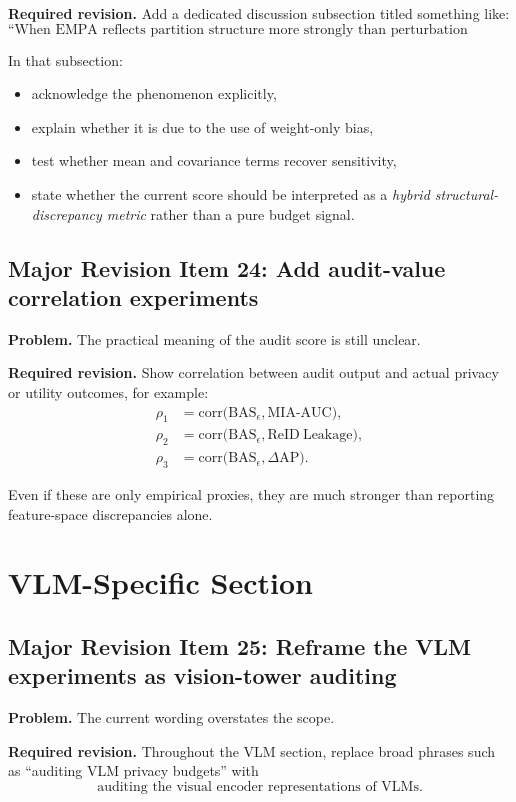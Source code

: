 \textbf{Required revision.}
Add a dedicated discussion subsection titled something like:
\[
\text{``When EMPA reflects partition structure more strongly than perturbation magnitude.''}
\]

In that subsection:
\begin{itemize}
    \item acknowledge the phenomenon explicitly,
    \item explain whether it is due to the use of weight-only bias,
    \item test whether mean and covariance terms recover sensitivity,
    \item state whether the current score should be interpreted as a \emph{hybrid structural-discrepancy metric} rather than a pure budget signal.
\end{itemize}

\subsection*{Major Revision Item 24: Add audit-value correlation experiments}
\textbf{Problem.} The practical meaning of the audit score is still unclear.

\textbf{Required revision.}
Show correlation between audit output and actual privacy or utility outcomes, for example:
\begin{align}
\rho_1
&=
\mathrm{corr}
\bigl(
\mathrm{BAS}_\epsilon,
\mathrm{MIA\mbox{-}AUC}
\bigr), \\
\rho_2
&=
\mathrm{corr}
\bigl(
\mathrm{BAS}_\epsilon,
\mathrm{ReID\ Leakage}
\bigr), \\
\rho_3
&=
\mathrm{corr}
\bigl(
\mathrm{BAS}_\epsilon,
\Delta \mathrm{AP}
\bigr).
\end{align}

Even if these are only empirical proxies, they are much stronger than reporting feature-space discrepancies alone.

\section{VLM-Specific Section}

\subsection*{Major Revision Item 25: Reframe the VLM experiments as vision-tower auditing}
\textbf{Problem.} The current wording overstates the scope.

\textbf{Required revision.}
Throughout the VLM section, replace broad phrases such as ``auditing VLM privacy budgets'' with
\[
\text{auditing the visual encoder representations of VLMs}.
\]

